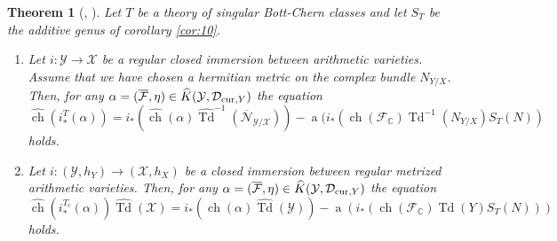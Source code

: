 \documentclass[10pt,twoside]{article}
\numberwithin{equation}{section}
\theoremstyle{plain}
\newtheorem{theorem}[equation]{Theorem}
\theoremstyle{definition}
\DeclareMathOperator{\Td}{Td}
\DeclareMathOperator{\ch}{ch}
\DeclareMathOperator{\amap}{a}
\newcommand{\CC}{{\mathbb C}}
\newcommand{\D}{\text{{\rm cur}}}
\begin{document}
\begin{theorem}[\cite{BismutGilletSoule:MR1086887},
  \cite{zha99:_rieman_roch}] \label{thm:15}  
  Let $T$ be a theory of singular Bott-Chern
  classes and let $S_{T}$ be the additive genus of corollary
  \ref{cor:10}. 
  \begin{enumerate}
  \item   Let $i\colon \mathcal{Y}\longrightarrow \mathcal{X}$ be a
    regular closed immersion between arithmetic varieties. Assume that
    we have chosen a hermitian metric on the complex bundle
    $N_{Y/X}$. Then, for any 
    $\alpha=(\overline {\mathcal{F}},\eta) \in
    \widehat K(\mathcal{Y},\mathcal{D}_{\D,Y})$ 
    the 
    equation
    \begin{equation}\label{eq:29}
      \widehat {\ch}(i^{T}_{\ast}(\alpha ))= 
      i_{\ast}(\widehat{\ch}(\alpha
      )\widehat{\Td}^{-1}(\overline{\mathcal{N}}
      _{\mathcal{Y}/\mathcal{X}}))
      -
      \amap(i_{\ast}(\ch(\mathcal{F}_{\CC})
      \Td^{-1}(N_{Y/X})S_{T}(N))
    \end{equation}
    holds.
  \item   Let $i\colon (\mathcal{Y},h_{Y})\longrightarrow (\mathcal{X},h_{X})$ be a
    closed immersion between regular metrized arithmetic
    varieties. Then, for any 
    $\alpha=(\overline {\mathcal{F}},\eta) \in
    \widehat K(\mathcal{Y},\mathcal{D}_{\D,Y})$ the equation
    \begin{equation}\label{eq:24}
      \widehat {\ch}(i^{T_{c}}_{\ast}(\alpha ))\widehat
      {\Td}(\mathcal{X})= 
      i_{\ast}(\widehat{\ch}(\alpha
      )\widehat{\Td}(\mathcal{Y}))-\amap(i_{\ast}(\ch(
      \mathcal{F}_{\CC})\Td(Y)S_{T}(N)))
    \end{equation}  
    holds.
  \end{enumerate}
\end{theorem}
\end{document}
